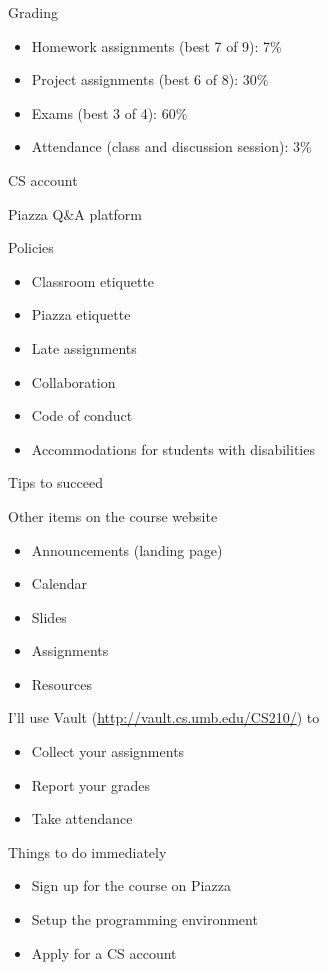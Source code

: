 \documentclass[8pt,a4paper,compress]{beamer}
\begin{document}
\begin{frame}[fragile]
Grading
\begin{itemize}
\item Homework assignments (best 7 of 9): 7\%
\item Project assignments (best 6 of 8): 30\%
\item Exams (best 3 of 4): 60\%
\item Attendance (class and discussion session): 3\%
\end{itemize}

\bigskip

CS account

\bigskip

Piazza Q\&A platform

\bigskip

Policies
\begin{itemize}
\item Classroom etiquette
\item Piazza etiquette
\item Late assignments
\item Collaboration
\item Code of conduct
\item Accommodations for students with disabilities
\end{itemize}
\end{frame}

\begin{frame}[fragile]
Tips to succeed

\bigskip

Other items on the course website
\begin{itemize}
\item Announcements (landing page)
\item Calendar
\item Slides 
\item Assignments
\item Resources
\end{itemize}

\bigskip

I'll use Vault (\href{http://vault.cs.umb.edu/CS210/}{http://vault.cs.umb.edu/CS210/}) to
\begin{itemize}
\item Collect your assignments
\item Report your grades
\item Take attendance
\end{itemize}

\bigskip

Things to do immediately
\begin{itemize}
\item Sign up for the course on Piazza
\item Setup the programming environment
\item Apply for a CS account
\end{itemize}
\end{frame}
\end{document}

